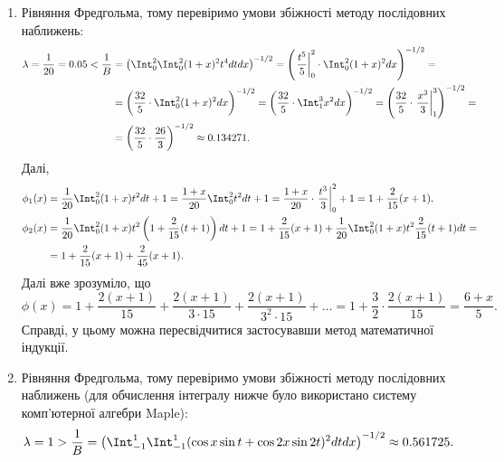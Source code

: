 \begin{solution}
    \begin{enumerate}
        \item Рівняння Фредгольма, тому перевіримо умови збіжності методу послідовних наближень: 
        \begin{equation*}
            \begin{split}
                \lambda = \dfrac{1}{20} = 0.05 < \dfrac{1}{B} &= \left(\Int_0^2 \Int_0^2 (1 + x)^2 t^4 dt dx\right)^{-1/2} = \left(\left.\dfrac{t^5}{5}\right|_0^2 \cdot \Int_0^2 (1 + x)^2 dx\right)^{-1/2} = \\ 
                &= \left(\dfrac{32}{5} \cdot \Int_0^2 (1 + x)^2 dx\right)^{-1/2} = \left(\dfrac{32}{5} \cdot \Int_1^3 x^2 dx\right)^{-1/2} = \left(\dfrac{32}{5} \cdot \left.\dfrac{x^3}{3}\right|_1^3\right)^{-1/2} = \\
                &= \left(\dfrac{32}{5} \cdot \dfrac{26}{3}\right)^{-1/2} \approx 0.134271.
            \end{split}
        \end{equation*}
        Далі,
        \begin{equation*}
            \begin{split}
            \phi_1(x) &= \dfrac{1}{20} \Int_0^2 (1 + x) t^2 dt + 1 = \dfrac{1 + x}{20} \Int_0^2 t^2 dt + 1 = \dfrac{1 + x}{20} \cdot \left.\dfrac{t^3}{3}\right|_0^2 + 1 = 1 + \dfrac{2}{15}(x + 1). \\
            \phi_2(x) &= \dfrac{1}{20} \Int_0^2 (1 + x) t^2 \left(1 + \dfrac{2}{15}(t + 1)\right) dt + 1 = 1 + \dfrac{2}{15}(x + 1) + \dfrac{1}{20} \Int_0^2 (1 + x) t^2 \dfrac{2}{15}(t + 1) dt = \\ 
            &= 1 + \dfrac{2}{15}(x + 1) + \dfrac{2}{45}(x + 1).
            \end{split}
        \end{equation*}
        Далі вже зрозуміло, що 
        \[
            \phi(x) = 1 + \dfrac{2(x + 1)}{15} + \dfrac{2(x + 1)}{3\cdot 15} + \dfrac{2(x + 1)}{3^2\cdot 15} + \ldots = 1 + \dfrac{3}{2} \cdot \dfrac{2(x+1)}{15} = \dfrac{6+x}{5}.
        \]
        Справді, у цьому можна пересвідчитися застосувавши метод математичної індукції.
        \item Рівняння Фредгольма, тому перевіримо умови збіжності методу послідовних наближень (для обчислення інтегралу нижче було використано систему комп'ютерної алгебри Maple): 
        \[
            \begin{split}
                \lambda = 1 > \dfrac{1}{B} &= \left(\Int_{-1}^1 \Int_{-1}^1 (\cos x \sin t + \cos 2x \sin 2t)^2 dt dx\right)^{-1/2} \approx 0.561725.

\end{split}\]
\end{enumerate}
\end{solution}
